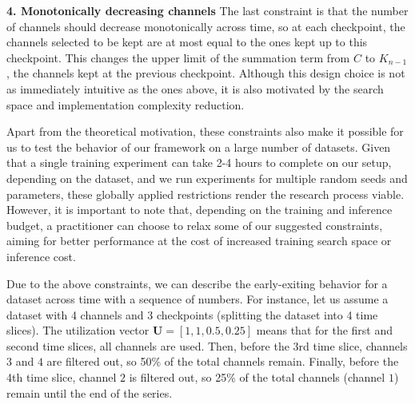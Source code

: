 \documentclass[conference]{IEEEtran}
\begin{document}
\textbf{4. Monotonically decreasing channels} The last constraint is that the number of channels should decrease monotonically across time, so at each checkpoint, the channels selected to be kept are at most equal to the ones kept up to this checkpoint. This changes the upper limit of the summation term from $C$ to $K_{n-1}$, the channels kept at the previous checkpoint. Although this design choice is not as immediately intuitive as the ones above, it is also motivated by the search space and implementation complexity reduction.

Apart from the theoretical motivation, these constraints also make it possible for us to test the behavior of our framework on a large number of datasets. Given that a single training experiment can take 2-4 hours to complete on our setup, depending on the dataset, and we run experiments for multiple random seeds and parameters, these globally applied restrictions render the research process viable. However, it is important to note that, depending on the training and inference budget, a practitioner can choose to relax some of our suggested constraints, aiming for better performance at the cost of increased training search space or inference cost.

Due to the above constraints, we can describe the early-exiting behavior for a dataset across time with a sequence of numbers. For instance, let us assume a dataset with 4 channels and 3 checkpoints (splitting the dataset into 4 time slices). The utilization vector $\textbf{U} = [1,1,0.5,0.25]$ means that for the first and second time slices, all channels are used. Then, before the 3rd time slice, channels $3$ and $4$ are filtered out, so 50\% of the total channels remain. Finally, before the 4th time slice, channel $2$ is filtered out, so 25\% of the total channels (channel $1$) remain until the end of the series.

 
\end{document}

